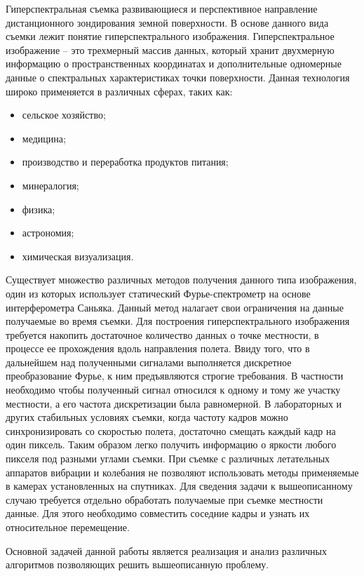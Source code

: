 \label{sec:intro}
Гиперспектральная съемка развивающиеся и перспективное направление дистанционного зондирования земной поверхности. В основе данного вида съемки лежит понятие гиперспектрального изображения. Гиперспектральное изображение -- это трехмерный массив данных, который хранит двухмерную информацию о пространственных координатах и дополнительные одномерные данные о спектральных характеристиках точки поверхности. Данная технология широко применяется в различных сферах, таких как:
\begin{itemize}
    \item сельское хозяйство;
    \item медицина;
    \item производство и переработка продуктов питания;
    \item минералогия;
    \item физика;
    \item астрономия;
    \item химическая визуализация.
\end{itemize}
Существует множество различных методов получения данного типа изображения, один из которых использует статический Фурье-спектрометр на основе интерферометра Саньяка. Данный метод налагает свои ограничения на данные получаемые во время съемки. Для построения гиперспектрального изображения требуется накопить достаточное количество данных о точке местности, в процессе ее прохождения вдоль направления полета. Ввиду того, что в дальнейшем над полученными сигналами выполняется дискретное преобразование Фурье, к ним предъявляются строгие требования. В частности необходимо чтобы полученный сигнал относился к одному и тому же участку местности, а его частота дискретизации была равномерной. В лабораторных и других стабильных условиях съемки, когда частоту кадров можно синхронизировать со скоростью полета, достаточно смещать каждый кадр на один пиксель. Таким образом легко получить информацию о яркости любого пикселя под разными углами съемки. При съемке с различных летательных аппаратов вибрации и колебания не позволяют использовать методы применяемые в камерах установленных на спутниках. Для сведения задачи к вышеописанному случаю требуется отдельно обработать получаемые при съемке местности данные. Для этого необходимо совместить соседние кадры и узнать их относительное перемещение. 

Основной задачей данной работы является реализация и анализ различных алгоритмов позволяющих решить вышеописанную проблему.

